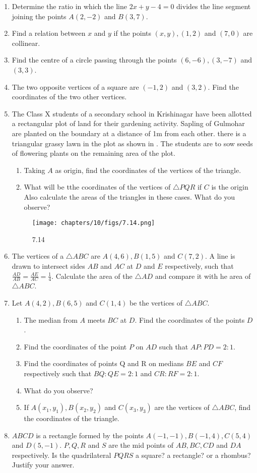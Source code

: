 \begin{enumerate}
\item Determine the ratio in which the line $2x+y-4=0$ divides the line segment joining the points $A(2,-2)$  and $B(3,7)$.
\item Find a relation between $x$ and $y$ if the points $(x,y), (1,2)$ and $(7,0)$ are collinear.
\item Find the centre of a circle passing through the points $(6,-6), (3,-7)$ and $(3,3)$.
\item The two opposite vertices of a square are $(-1,2)$ and $(3,2)$. Find the coordinates of the two other vertices.
\item The Class X students of a secondary school in Krishinagar have been allotted a rectangular plot of land for their gardening activity. Sapling of Gulmohar are planted on the boundary at a distance of 1m from each other. there is a triangular grassy lawn in the plot as shown in . The students are to sow seeds of flowering plants on the remaining area of the plot.
\begin{enumerate}[label=(\roman*)]
\item Taking $A$ as origin, find the coordinates of the vertices of the triangle.
\item What will be tthe coordinates of the vertices of $\triangle PQR$ if $C$ is the origin Also calculate the areas of the triangles in these cases. What do you observe?
\end{enumerate}
\begin{figure}[ht]
\centering
\texttt{[image: chapters/10/figs/7.14.png]}
\caption{7.14}
  \label{fig:7.14}
\end{figure}
\item The vertices of a $\triangle ABC$ are $A(4,6), B(1,5)$ and $C(7,2)$. A line is drawn to intersect sides $AB$ and $AC$ at $D$ and $E$ respectively, such that $\frac {AD}{AB}=\frac{AE}{AC}=\frac{1}{4}$. Calculate the area of the $\triangle AD$ and compare it with he area of $\triangle ABC$.
\item Let $A(4,2), B(6,5)$ and $C(1,4)$ be the vertices of $\triangle ABC$.
\begin{enumerate}[label=(\roman*)]
\item The median from $A$ meets $BC$ at $D$. Find the coordinates of the points $D$.
\item Find the coordinates of the point $P$ on $AD$ such that $AP:PD=2:1$.
\item Find the coordinates of points Q and R on medians $BE$ and $CF$ respectively such that $BQ:QE=2:1$ and $CR:RF=2:1$.
\item What do you observe?
\item If $A(x_1,y_1), B(x_2,y_2)$ and $C(x_3,y_3)$ are the vertices of $\triangle ABC$, find the coordinates of the triangle.
\end{enumerate}
\item  $ABCD$ is a rectangle formed by the points  $A(-1,-1), B(-1,4), C(5,4)$ and $D(5,-1)$. $P, Q, R$ and $S$ are the mid points of $AB, BC, CD$ and $DA$ respectively. Is the quadrilateral $PQRS$ a square? a rectangle? or a rhombus? Justify your answer.
\end{enumerate}
